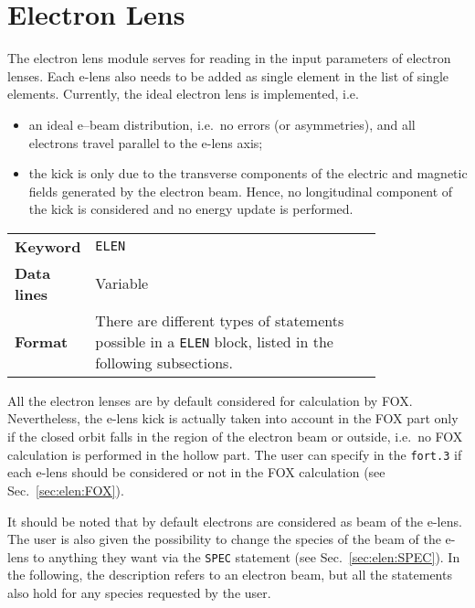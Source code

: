 \section{Electron Lens} \label{sec:elen}

The electron lens module serves for reading in the input parameters of electron lenses.
Each e-lens also needs to be added as single element in the list of single elements.
Currently, the ideal electron lens is implemented, i.e.
\begin{itemize}
\item an ideal e--beam distribution, i.e.~no errors (or asymmetries), and all electrons travel parallel to the e-lens axis;
\item the kick is only due to the transverse components of the electric and magnetic fields generated by the electron beam.
  Hence, no longitudinal component of the kick is considered and no energy update is performed.
\end{itemize}

\bigskip
\begin{tabular}{@{}lp{0.8\linewidth}}
    \textbf{Keyword}    & \texttt{ELEN}\index{ELEN} \\
    \textbf{Data lines} & Variable \\
    \textbf{Format}     & There are different types of statements possible in a \texttt{ELEN} block, listed in the following subsections. \\
\end{tabular}

\bigskip
\noindent All the electron lenses are by default considered for calculation by FOX. Nevertheless, the e-lens kick is actually taken into account in the FOX part only if the closed orbit falls in the region of the electron beam or outside, i.e.~no FOX calculation is performed in the hollow part. The user can specify in the \texttt{fort.3} if each e-lens should be considered or not in the FOX calculation (see Sec.~\ref{sec:elen:FOX}).

\noindent It should be noted that by default electrons are considered as beam of the e-lens.
The user is also given the possibility to change the species of the beam of the e-lens to anything they want via the \texttt{SPEC} statement (see Sec.~\ref{sec:elen:SPEC}).
In the following, the description refers to an electron beam, but all the statements also hold for any species requested by the user.

